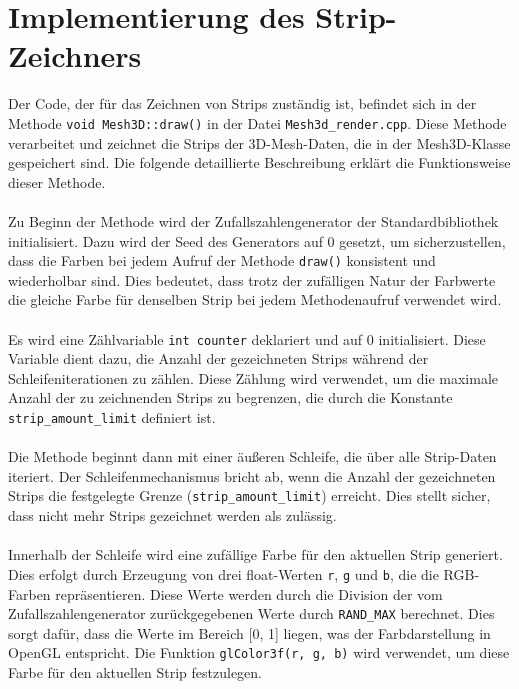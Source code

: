 \chapter{Implementierung des Strip-Zeichners}

Der Code, der für das Zeichnen von Strips zuständig ist, befindet sich in der
Methode \lstinline{void Mesh3D::draw()} in der Datei \lstinline{Mesh3d_render.cpp}. Diese Methode
verarbeitet und zeichnet die Strips der 3D-Mesh-Daten, die in der Mesh3D-Klasse
gespeichert sind. Die folgende detaillierte Beschreibung erklärt die
Funktionsweise dieser Methode.
\\
\\
Zu Beginn der Methode wird der Zufallszahlengenerator der Standardbibliothek
initialisiert. Dazu wird der Seed des Generators auf 0 gesetzt, um
sicherzustellen, dass die Farben bei jedem Aufruf der Methode \lstinline{draw()} konsistent
und wiederholbar sind. Dies bedeutet, dass trotz der zufälligen Natur der
Farbwerte die gleiche Farbe für denselben Strip bei jedem Methodenaufruf
verwendet wird. 
\\
\\
Es wird eine Zählvariable \lstinline{int counter} deklariert und auf 0 initialisiert. Diese
Variable dient dazu, die Anzahl der gezeichneten Strips während der
Schleifeniterationen zu zählen. Diese Zählung wird verwendet, um die maximale
Anzahl der zu zeichnenden Strips zu begrenzen, die durch die Konstante
\lstinline{strip_amount_limit} definiert ist.
\\
\\
Die Methode beginnt dann mit einer äußeren Schleife, die über alle Strip-Daten
iteriert. Der Schleifenmechanismus bricht ab, wenn die Anzahl der gezeichneten
Strips die festgelegte Grenze (\lstinline{strip_amount_limit}) erreicht. Dies stellt sicher,
dass nicht mehr Strips gezeichnet werden als zulässig.
\\
\\
Innerhalb der Schleife wird eine zufällige Farbe für den aktuellen Strip
generiert. Dies erfolgt durch Erzeugung von drei float-Werten \lstinline{r}, \lstinline{g} und \lstinline{b}, die
die RGB-Farben repräsentieren. Diese Werte werden durch die Division der vom
Zufallszahlengenerator zurückgegebenen Werte durch \lstinline{RAND_MAX} berechnet. Dies
sorgt dafür, dass die Werte im Bereich [0, 1] liegen, was der Farbdarstellung in
OpenGL entspricht. Die Funktion \lstinline{glColor3f(r, g, b)} wird verwendet, um diese
Farbe für den aktuellen Strip festzulegen.
\\
